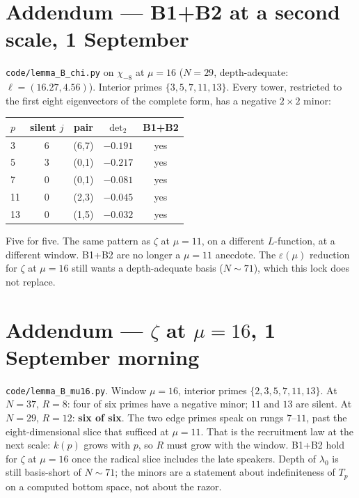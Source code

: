 \documentclass[10pt]{article}
\begin{document}
\section*{Addendum --- B1+B2 at a second scale, 1 September}

\texttt{code/lemma\_B\_chi.py} on $\chi_{-8}$ at $\mu=16$ ($N=29$,
depth-adequate: $\ell=(16.27,4.56)$). Interior primes $\{3,5,7,11,13\}$.
Every tower, restricted to the first eight eigenvectors of the complete
form, has a negative $2\times2$ minor:

\begin{center}\small
\begin{tabular}{lcccc}
\toprule
$p$ & silent $j$ & pair & $\det_2$ & B1+B2 \\
\midrule
3  & 6 & (6,7) & $-0.191$ & yes \\
5  & 3 & (0,1) & $-0.217$ & yes \\
7  & 0 & (0,1) & $-0.081$ & yes \\
11 & 0 & (2,3) & $-0.045$ & yes \\
13 & 0 & (1,5) & $-0.032$ & yes \\
\bottomrule
\end{tabular}
\end{center}
Five for five. The same pattern as $\zeta$ at $\mu=11$, on a different
$L$-function, at a different window. B1+B2 are no longer a $\mu=11$
anecdote. The $\varepsilon(\mu)$ reduction for $\zeta$ at $\mu=16$ still
wants a depth-adequate basis ($N\sim71$), which this lock does not
replace.

\section*{Addendum --- $\zeta$ at $\mu=16$, 1 September morning}

\texttt{code/lemma\_B\_mu16.py}. Window $\mu=16$, interior primes
$\{2,3,5,7,11,13\}$. At $N=37$, $R=8$: four of six primes have a
negative minor; $11$ and $13$ are silent. At $N=29$, $R=12$:
\textbf{six of six}. The two edge primes speak on rungs $7$--$11$,
past the eight-dimensional slice that sufficed at $\mu=11$. That is
the recruitment law at the next scale: $k(p)$ grows with $p$, so $R$
must grow with the window. B1+B2 hold for $\zeta$ at $\mu=16$ once
the radical slice includes the late speakers. Depth of $\lambda_0$ is
still basis-short of $N\sim71$; the minors are a statement about
indefiniteness of $T_p$ on a computed bottom space, not about the
razor.
\end{document}
